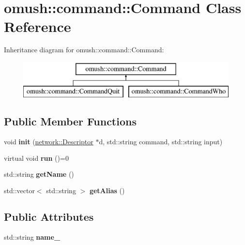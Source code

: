 \hypertarget{classomush_1_1command_1_1_command}{\section{omush\-:\-:command\-:\-:Command Class Reference}
\label{classomush_1_1command_1_1_command}
}
Inheritance diagram for omush\-:\-:command\-:\-:Command\-:\begin{figure}[H]
\begin{center}
\leavevmode
\includegraphics[height=2.000000cm]{classomush_1_1command_1_1_command}
\end{center}
\end{figure}
\subsection*{Public Member Functions}
\begin{DoxyCompactItemize}
\item 
\hypertarget{classomush_1_1command_1_1_command_a765d7faca58701250353e41881b11ba4}{void {\bfseries init} (\hyperlink{classomush_1_1network_1_1_descriptor}{network\-::\-Descriptor} $\ast$d, std\-::string command, std\-::string input)}\label{classomush_1_1command_1_1_command_a765d7faca58701250353e41881b11ba4}

\item 
\hypertarget{classomush_1_1command_1_1_command_a886b4edad3aefcc17420be6e11c2a5e1}{virtual void {\bfseries run} ()=0}\label{classomush_1_1command_1_1_command_a886b4edad3aefcc17420be6e11c2a5e1}

\item 
\hypertarget{classomush_1_1command_1_1_command_a042a3742ef5a5baa04938a6d32900b48}{std\-::string {\bfseries get\-Name} ()}\label{classomush_1_1command_1_1_command_a042a3742ef5a5baa04938a6d32900b48}

\item 
\hypertarget{classomush_1_1command_1_1_command_a417479aa6a8ca9c23a79bfd29c397ed9}{std\-::vector$<$ std\-::string $>$ {\bfseries get\-Alias} ()}\label{classomush_1_1command_1_1_command_a417479aa6a8ca9c23a79bfd29c397ed9}

\end{DoxyCompactItemize}
\subsection*{Public Attributes}
\begin{DoxyCompactItemize}
\item 
\hypertarget{classomush_1_1command_1_1_command_af3f93e5375aeab197ab9793d3a1f4914}{std\-::string {\bfseries name\-\_\-}}\label{classomush_1_1command_1_1_command_af3f93e5375aeab197ab9793d3a1f4914}

\end{DoxyCompactItemize}
